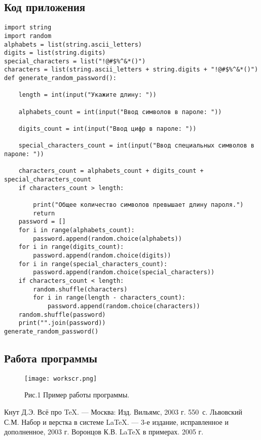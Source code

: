 \documentclass[12pt,a4paper]{scrartcl}
\begin{document}
\subsection{Код приложения}
\label{sec:exp:code}
\begin{verbatim}
import string
import random
alphabets = list(string.ascii_letters)
digits = list(string.digits)
special_characters = list("!@#$%^&*()")
characters = list(string.ascii_letters + string.digits + "!@#$%^&*()")
def generate_random_password():

	length = int(input("Укажите длину: "))
 
	alphabets_count = int(input("Ввод символов в пароле: "))
 
	digits_count = int(input("Ввод цифр в пароле: "))
 
	special_characters_count = int(input("Ввод специальных символов в пароле: "))
 
	characters_count = alphabets_count + digits_count + special_characters_count
	if characters_count > length:
 
		print("Общее количество символов превышает длину пароля.")
		return
	password = []
	for i in range(alphabets_count):
		password.append(random.choice(alphabets))
	for i in range(digits_count):
		password.append(random.choice(digits))
	for i in range(special_characters_count):
		password.append(random.choice(special_characters))
	if characters_count < length:
		random.shuffle(characters)
		for i in range(length - characters_count):
			password.append(random.choice(characters))
	random.shuffle(password)
	print("".join(password))
generate_random_password()
        \end{verbatim}


\subsection{Работа программы} 



\begin{wrapfigure}
  \begin{center}
    \texttt{[image: workscr.png]}
  \end{center}
  \caption{Рис.1  Пример работы программы.}\label{fig:ex}
\end{wrapfigure}

\newpage
\begin{thebibliography}{9}
Кнут Д.Э. Всё про \TeX. \newblock --- Москва: Изд. Вильямс, 2003 г. 550~с.
Львовский С.М. Набор и верстка в системе \LaTeX{}. \newblock --- 3-е издание, исправленное и дополненное, 2003 г.
Воронцов К.В. \LaTeX{} в примерах. 2005 г.
\end{thebibliography}
\end{document}
